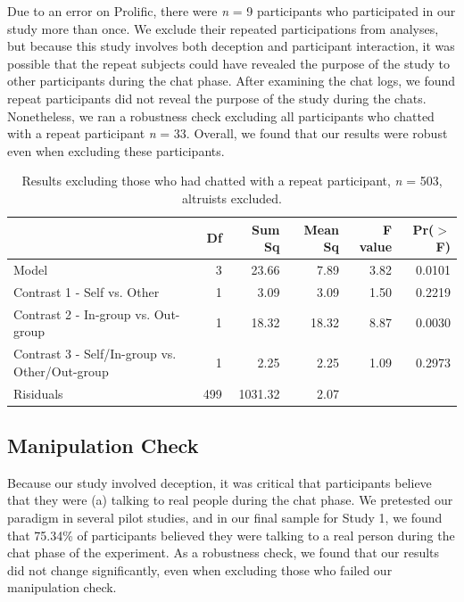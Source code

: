 \documentclass[12pt,]{article}
\begin{document}
Due to an error on Prolific, there were \emph{n} = 9 participants who participated in our study more than once. We exclude their repeated participations from analyses, but because this study involves both deception and participant interaction, it was possible that the repeat subjects could have revealed the purpose of the study to other participants during the chat phase. After examining the chat logs, we found repeat participants did not reveal the purpose of the study during the chats. Nonetheless, we ran a robustness check excluding all participants who chatted with a repeat participant \emph{n} = 33. Overall, we found that our results were robust even when excluding these participants.  

\begin{table}[ht]
\centering
\begin{tabular}{lrrrrr}
  \hline
 & Df & Sum Sq & Mean Sq & F value & Pr($>$F) \\ 
  \hline
Model & 3 & 23.66 & 7.89 & 3.82 & 0.0101 \\ 
  Contrast 1 - Self vs. Other & 1 & 3.09 & 3.09 & 1.50 & 0.2219 \\ 
  Contrast 2 - In-group vs. Out-group & 1 & 18.32 & 18.32 & 8.87 & 0.0030 \\ 
  Contrast 3 - Self/In-group vs. Other/Out-group & 1 & 2.25 & 2.25 & 1.09 & 0.2973 \\ 
  Risiduals & 499 & 1031.32 & 2.07 &  &  \\ 
   \hline
\end{tabular}
\caption{Results excluding those who had chatted with a repeat participant, \emph{n} = 503, altruists excluded. } 
\label{repeats_s1}
\end{table}


\newpage
\subsection{Manipulation Check}
\label{appendix:manip1}

Because our study involved deception, it was critical that participants believe that they were (a) talking to real people during the chat phase. We pretested our paradigm in several pilot studies, and in our final sample for Study 1, we found that  75.34\% of participants believed they were talking to a real person during the chat phase of the experiment. As a robustness check, we found that our results did not change significantly, even when excluding those who failed our manipulation check. 
\end{document}
